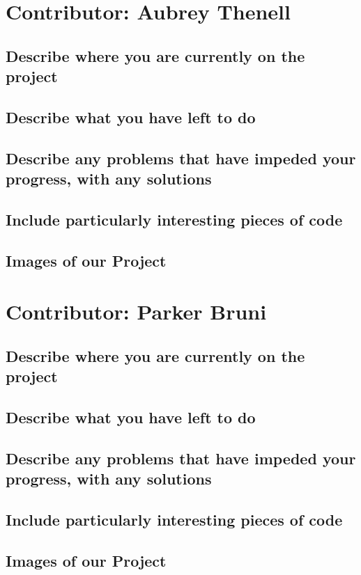 \documentclass[letterpaper,10pt,serif,draftclsnofoot,onecolumn,compsoc,titlepage]{IEEEtran}
\begin{document}
\section{Contributor: Aubrey Thenell}
\subsection{Describe where you are currently on the project}
\subsection{Describe what you have left to do}
\subsection{Describe any problems that have impeded your progress, with any solutions}
\subsection{Include particularly interesting pieces of code}
\subsection{Images of our Project} 

\section{Contributor: Parker Bruni}
\subsection{Describe where you are currently on the project}
\subsection{Describe what you have left to do}
\subsection{Describe any problems that have impeded your progress, with any solutions}
\subsection{Include particularly interesting pieces of code}
\subsection{Images of our Project} 


\newpage


\end{document}
